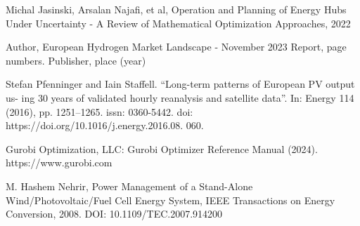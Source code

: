 \begin{thebibliography}{}

Michal Jasinski, Arsalan Najafi, et al,
Operation and Planning of Energy Hubs Under Uncertainty - A Review of Mathematical Optimization Approaches,
2022


Author, European Hydrogen Market Landscape - November 2023 Report, page numbers. Publisher, place (year)


Stefan Pfenninger and Iain Staffell. “Long-term patterns of European PV output us-
ing 30 years of validated hourly reanalysis and satellite data”. In: Energy 114 (2016),
pp. 1251–1265. issn: 0360-5442. doi: https://doi.org/10.1016/j.energy.2016.08.
060.

Gurobi Optimization, LLC: Gurobi Optimizer Reference Manual (2024). https://www.gurobi.com

M. Hashem Nehrir, Power Management of a Stand-Alone Wind/Photovoltaic/Fuel Cell Energy System, IEEE Transactions on Energy Conversion, 2008. DOI: 10.1109/TEC.2007.914200




\end{thebibliography}
